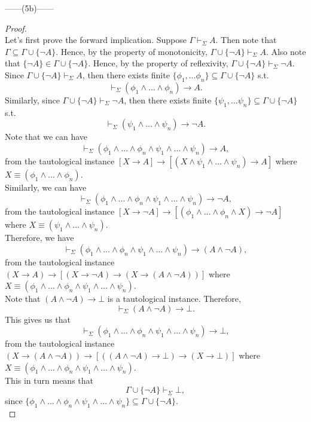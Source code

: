 \documentclass[12pt]{article}
\newcommand{\dr}{\vdash_{\Sigma}}
\begin{document}
\noindent
\begin{center}
    ------(5b)------
\end{center} 
\begin{proof} $ $\\
    Let's first prove the forward implication.
    Suppose $\Gamma \dr A$. 
    Then note that $\Gamma \subseteq \Gamma \cup \{\neg A\}$.
    Hence, by the property of monotonicity, $\Gamma \cup \{\neg A\} \dr A$.
    Also note that $\{\neg A\} \in \Gamma \cup \{\neg A\}$.
    Hence, by the property of reflexivity, $\Gamma \cup \{\neg A\} \dr \neg A$.\\
    Since $\Gamma \cup \{\neg A\} \dr A$, then there exists finite $\{\phi_1, \dots \phi_n \} \subseteq \Gamma \cup \{\neg A\}$ s.t.
    $$\dr (\phi_1 \land \dots \land \phi_n) \to A.$$
    Similarly, since $\Gamma \cup \{\neg A\} \dr \neg A$, then there exists finite $\{\psi_1, \dots \psi_n \} \subseteq \Gamma \cup \{\neg A\}$ s.t.
    $$\dr (\psi_1 \land \dots \land \psi_n) \to \neg A.$$
    Note that we can have
    $$\dr (\phi_1 \land \dots \land \phi_n \land \psi_1 \land \dots \land \psi_n) \to A,$$
    from the tautological instance
    $[X \to A] \to [(X \land \psi_1 \land \dots \land \psi_n) \to A]$ where $X \equiv (\phi_1 \land \dots \land \phi_n)$.\\
    Similarly, we can have
    $$\dr (\phi_1 \land \dots \land \phi_n \land \psi_1 \land \dots \land \psi_n) \to \neg A,$$
    from the tautological instance
    $[X \to \neg A] \to [(\phi_1 \land \dots \land \phi_n \land X) \to \neg A]$ where $X \equiv (\psi_1 \land \dots \land \psi_n)$.\\
    Therefore, we have
    $$\dr (\phi_1 \land \dots \land \phi_n \land \psi_1 \land \dots \land \psi_n) \to (A \land \neg A),$$
    from the tautological instance
    $(X \to A) \to [(X \to \neg A) \to (X \to (A \land \neg A))]$ where $X \equiv (\phi_1 \land \dots \land \phi_n \land \psi_1 \land \dots \land \psi_n)$.\\
    Note that $(A \land \neg A) \to \bot$ is a tautological instance. Therefore,
    $$\dr (A \land \neg A) \to \bot.$$
    This gives us that
    $$\dr (\phi_1 \land \dots \land \phi_n \land \psi_1 \land \dots \land \psi_n) \to \bot,$$
    from the tautological instance
    $(X \to (A \land \neg A)) \to [((A \land \neg A) \to \bot) \to (X \to \bot)]$ where $X \equiv (\phi_1 \land \dots \land \phi_n \land \psi_1 \land \dots \land \psi_n)$.\\
    This in turn means that 
    $$\Gamma \cup \{\neg A\} \dr \bot,$$
    since $\{\phi_1 \land \dots \land \phi_n \land \psi_1 \land \dots \land \psi_n\} \subseteq \Gamma \cup \{\neg A\}$.\\

\end{proof}
\end{document}
